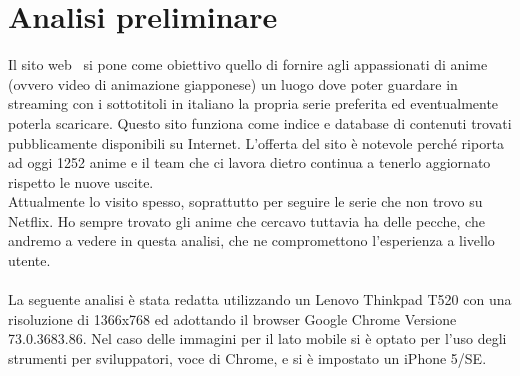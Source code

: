 \section{Analisi preliminare}
Il sito web \nomeSito \ si pone come obiettivo quello di fornire agli appassionati di anime (ovvero video di animazione giapponese) un luogo dove poter guardare in streaming con i sottotitoli in italiano la propria serie preferita ed eventualmente poterla scaricare. Questo sito funziona come indice e database di contenuti trovati pubblicamente disponibili su Internet. L'offerta del sito è notevole perché riporta ad oggi 1252 anime e il team che ci lavora dietro continua a tenerlo aggiornato rispetto le nuove uscite. \\
Attualmente lo visito spesso, soprattutto per seguire le serie che non trovo su Netflix. Ho sempre trovato gli anime che cercavo tuttavia ha delle pecche, che andremo a vedere in questa analisi, che ne compromettono l'esperienza a livello utente.
\\
\\
La seguente analisi è stata redatta utilizzando un Lenovo Thinkpad T520 con una risoluzione di 1366x768 ed adottando il browser Google Chrome Versione 73.0.3683.86. Nel caso delle immagini per il lato mobile si è optato per l'uso degli strumenti per sviluppatori, voce di Chrome, e si è impostato un iPhone 5/SE.  
